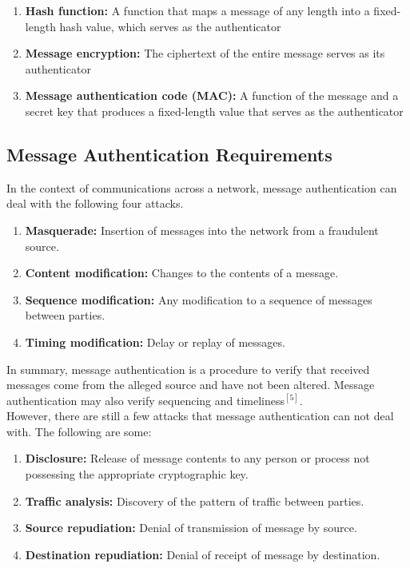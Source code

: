 \documentclass[12pt,a4paper,oneside]{report}
\begin{document}
\begin{enumerate}[(1)]
    \item \textbf{Hash function:} A function that maps a message of any length into a fixed-length
hash value, which serves as the authenticator
    \item \textbf{Message encryption:} The ciphertext of the entire message serves as its authenticator
    \item \textbf{Message authentication code (MAC):} A function of the message and a secret
key that produces a fixed-length value that serves as the authenticator
\end{enumerate}

\subsection{Message Authentication Requirements}
In the context of communications across a network, message authentication can deal with the following four attacks.

\begin{enumerate}[(1)]
    \item \textbf{Masquerade:} Insertion of messages into the network from a fraudulent source.
    \item \textbf{Content modification:} Changes to the contents of a message.
    \item \textbf{Sequence modification:} Any modification to a sequence of messages between
parties.
    \item \textbf{Timing modification:} Delay or replay of messages.
\end{enumerate}

In summary, message authentication is a procedure to verify that received messages come from the alleged source and have not been altered. Message authentication may also verify sequencing and timeliness$^{[5]}$.
\\

However, there are still a few attacks that message authentication can not deal with. The following are some:

\begin{enumerate}[(1)]
    \item \textbf{Disclosure:} Release of message contents to any person or process not possessing the appropriate cryptographic key.
    \item \textbf{Traffic analysis:} Discovery of the pattern of traffic between parties.
    \item \textbf{Source repudiation:} Denial of transmission of message by source.
    \item \textbf{Destination repudiation:} Denial of receipt of message by destination.
\end{enumerate}
\end{document}
